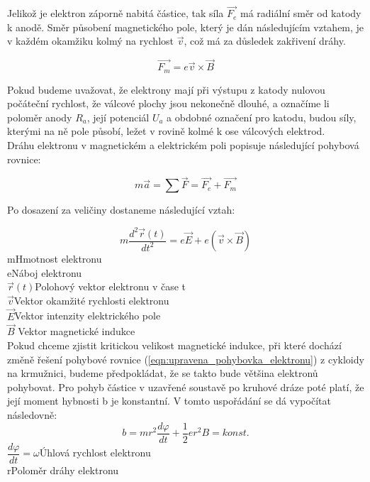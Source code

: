 \documentclass{praktikum}
\begin{document}
Jelikož je elektron záporně nabitá částice, tak síla $\vec{F_e}$ má radiální směr od katody k anodě. Směr působení magnetického pole, který je dán následujícím vztahem, je v každém okamžiku kolmý na rychlost $\vec{v}$, což má za důsledek zakřivení dráhy.

\begin{equation}
\vec{F_m} = e\vec{v}\times\vec{B}
\end{equation}

Pokud budeme uvažovat, že elektrony mají při výstupu z katody nulovou počáteční rychlost, že válcové plochy jsou nekonečně dlouhé, a označíme li poloměr anody $R_a$, její potenciál $U_a$ a obdobné označení pro katodu, budou síly, kterými na ně pole působí, ležet v rovině kolmé k ose válcových elektrod. \hfill \\

\indent Dráhu elektronu v magnetickém a elektrickém poli popisuje následující pohybová rovnice:

\begin{equation}
\label{eqn:pohybovka_elektronu}
m\vec{a}=\sum\vec{F}=\vec{F_e}+\vec{F_m}
\end{equation}

Po dosazení za veličiny dostaneme následující vztah:

\begin{equation}
\label{eqn:upravena_pohybovka_elektronu}
m\frac{d^2\vec{r}(t)}{dt^2}=e\vec{E}+e(\vec{v}\times\vec{B})
\end{equation}m\dotfill Hmotnost elektronu\\
e\dotfill Náboj elektronu\\
$\vec{r}(t)$\dotfill Polohový vektor elektronu v čase t\\
$\vec{v}$\dotfill Vektor okamžité rychlosti elektronu\\
$\vec{E}$\dotfill Vektor intenzity elektrického pole\\
$\vec{B}$ \dotfill Vektor magnetické indukce\\

\indent Pokud chceme zjistit kritickou velikost magnetické indukce, při které dochází změně řešení pohybové rovnice (\ref{eqn:upravena_pohybovka_elektronu}) z cykloidy na krmužnici, budeme předpokládat, že se takto bude většina elektronů pohybovat. Pro pohyb částice v uzavřené soustavě po kruhové dráze poté platí, že její moment hybnosti b je konstantní. V tomto uspořádání se dá vypočítat následovně:
\begin{equation}
\label{eqn:moment_hybnosti}
b=mr^2\frac{d\varphi}{dt}+\frac{1}{2}er^2B=konst.
\end{equation}$\dfrac{d\varphi}{dt}=\omega$\dotfill Úhlová rychlost elektronu\\
r\dotfill Poloměr dráhy elektronu\\
\end{document}
